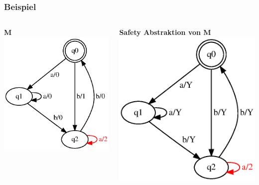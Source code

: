 \documentclass[10pt]{beamer}
\begin{document}
\begin{frame}
\frametitle{Beispiel}
\begin{columns}[T] %

\begin{column}{.50\textwidth}
\textbf{M}
\includegraphics[width=\textwidth]{images/fsm-example01}
\end{column}%

\begin{column}{.50\textwidth}
\textbf{Safety Abstraktion von M}
\includegraphics[width=\textwidth]{images/fsm-example01_abs}
\end{column}%
\end{columns}
\end{frame}
\end{document}

